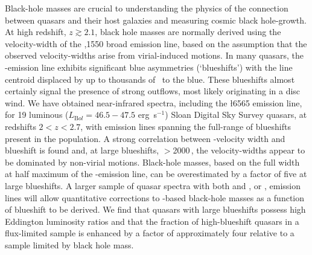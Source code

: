 Black-hole masses are crucial to understanding the physics of the connection between quasars and their host galaxies and measuring cosmic black hole-growth. 
At high redshift, $z \gtrsim 2.1$, black hole masses are normally derived using the velocity-width of the ,1550 broad emission line, based on the assumption that the observed velocity-widths arise from virial-induced motions.  
In many quasars, the -emission line exhibits significant blue asymmetries (`blueshifts') with the line centroid displaced by up to thousands of \kms\, to the blue. 
These blueshifts almost certainly signal the presence of strong outflows, most likely originating in a disc wind.
We have obtained near-infrared spectra, including the \ha\l6565 emission line, for 19 luminous ($L_{\mathrm Bol} = 46.5-47.5$ erg~s$^{-1}$) Sloan Digital Sky Survey quasars, at redshifts $2 < z < 2.7$, with  emission lines spanning the full-range of blueshifts present in the population.  
A strong correlation between -velocity width and blueshift is found and, at large blueshifts, $>$2000\,\kms, the velocity-widths appear to be dominated by non-virial motions. 
Black-hole masses, based on the full width at half maximum of the -emission line, can be overestimated by a factor of five at large blueshifts. 
A larger sample of quasar spectra with both  and \hbns, or \hans, emission lines will allow quantitative corrections to -based black-hole masses as a function of blueshift to be derived. 
We find that quasars with large  blueshifts possess high Eddington luminosity ratios and that the fraction of high-blueshift quasars in a flux-limited sample is enhanced by a factor of approximately four relative to a sample limited by black hole mass.    

